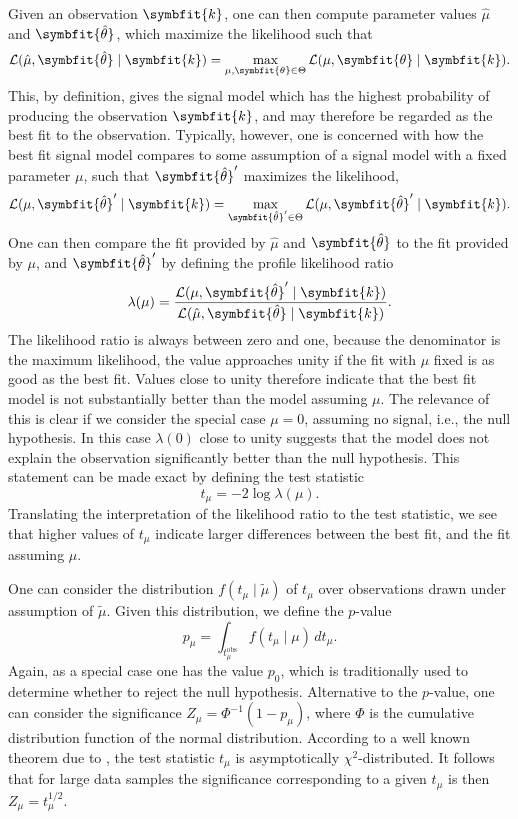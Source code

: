 \documentclass[b5paper, 10pt, twoside]{book}
\renewcommand{\vec}[1]{\symbfit{#1}}
\newcommand{\unitv}[1]{\symbfit{\hat{#1}}}
\newcommand{\difd}{\,d}
\begin{document}
Given an observation $\vec{k}$, one can then compute parameter values $\hat{\mu}$ and $\unitv{\theta}$, which maximize the likelihood such that
\begin{equation}
    \mathcal{L}(\hat{\mu},\unitv{\theta}\mid\vec{k})=\max_{\mu,\vec{\theta}\in\Theta}\mathcal{L}(\mu,\vec{\theta}\mid\vec{k}).
\end{equation}
This, by definition, gives the signal model which has the highest probability of producing the observation $\vec{k}$, and may therefore be regarded as the best fit to the observation. Typically, however, one is concerned with how the best fit signal model compares to some assumption of a signal model with a fixed parameter $\mu$, such that $\unitv{\theta}'$ maximizes the likelihood,
\begin{equation}
    \mathcal{L}(\mu,\unitv{\theta}'\mid\vec{k})=\max_{\unitv{\theta}'\in\Theta}\mathcal{L}(\mu,\unitv{\theta}'\mid\vec{k}).
\end{equation}
One can then compare the fit provided by $\hat{\mu}$ and $\unitv{\theta}$ to the fit provided by $\mu$, and $\unitv{\theta}'$ by defining the profile likelihood ratio
\begin{equation}
    \lambda(\mu)=\frac{\mathcal{L}(\mu,\unitv{\theta}'\mid\vec{k})}{\mathcal{L}(\hat{\mu},\unitv{\theta}\mid\vec{k})}.
\end{equation}
The likelihood ratio is always between zero and one, because the denominator is the maximum likelihood, the value approaches unity if the fit with $\mu$ fixed is as good as the best fit. Values close to unity therefore indicate that the best fit model is not substantially better than the model assuming $\mu$. The relevance of this is clear if we consider the special case $\mu=0$, assuming no signal, i.e., the null hypothesis. In this case $\lambda(0)$ close to unity suggests that the model does not explain the observation significantly better than the null hypothesis. This statement can be made exact by defining the test statistic
\begin{equation}
    t_\mu=-2\log\lambda(\mu).
\end{equation}
Translating the interpretation of the likelihood ratio to the test statistic, we see that higher values of $t_\mu$ indicate larger differences between the best fit, and the fit assuming $\mu$.

One can consider the distribution $f(t_\mu\mid\tilde{\mu})$ of $t_\mu$ over observations drawn under assumption of $\tilde{\mu}$. Given this distribution, we define the $p$-value
\begin{equation}
    p_\mu=\int_{t_\mu^\text{obs}}f(t_\mu\mid\mu)\difd t_\mu.
\end{equation}
Again, as a special case one has the value $p_0$, which is traditionally used to determine whether to reject the null hypothesis. Alternative to the $p$-value, one can consider the significance $Z_\mu=\Phi^{-1}(1-p_\mu)$, where $\Phi$ is the cumulative distribution function of the normal distribution. According to a well known theorem due to \textcite{Wilks1938}, the test statistic $t_\mu$ is asymptotically $\chi^2$-distributed. It follows that for large data samples the significance corresponding to a given $t_\mu$ is then $Z_\mu=t_\mu^{1/2}$.
\end{document}
